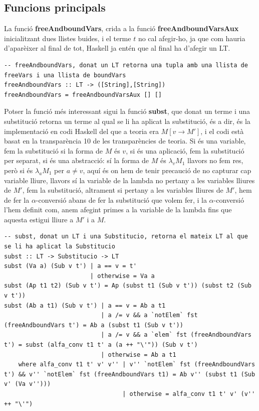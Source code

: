 \documentclass[10pt,a4paper]{article}
\begin{document}
\clearpage

\subsection{Funcions principals}

La funció \textbf{freeAndboundVars}, crida a la funció \textbf{freeAndboundVarsAux} inicialitzant dues llistes buides, i el terme $t$ no cal afegir-ho, ja que com hauria d'aparèixer al final de tot, Haskell ja entén que al final ha d'afegir un LT.

\lstset{language=Haskell, breaklines=true, basicstyle=\footnotesize}
\begin{lstlisting}[frame=mystyle]
-- freeAndboundVars, donat un LT retorna una tupla amb una llista de freeVars i una llista de boundVars
freeAndboundVars :: LT -> ([String],[String])
freeAndboundVars = freeAndboundVarsAux [] []
\end{lstlisting}

Potser la funció més interessant sigui la funció \textbf{subst}, que donat un terme i una substitució retorna un terme al qual se li ha aplicat la substitució, és a dir, és la implementació en codi Haskell del que a teoria era $M [v \rightarrow M']$, i el codi està basat en la transparència 10 de les transparències de teoria. Si és una variable, fem la substitució si la forma de $M$ és $v$, si és una aplicació, fem la substitució per separat, si és una abstracció: sí la forma de $M$ és $\lambda_v M_1$ llavors no fem res, però si és $\lambda_a M_1$ per $a \neq v$, aquí és on hem de tenir precaució de no capturar cap variable lliure, llavors sí la variable de la lambda no pertany a les variables lliures de $M'$, fem la substitució, altrament si pertany a les variables lliures de $M'$, hem de fer la $\alpha$-conversió abans de fer la substitució que volem fer, i la $\alpha$-conversió l'hem definit com, anem afegint primes a la variable de la lambda fins que aquesta estigui lliure a $M'$ i a $M$.

\lstset{language=Haskell, breaklines=true, basicstyle=\footnotesize}
\begin{lstlisting}[frame=mystyle]
-- subst, donat un LT i una Substitucio, retorna el mateix LT al que se li ha aplicat la Substitucio
subst :: LT -> Substitucio -> LT
subst (Va a) (Sub v t') | a == v = t'
                        | otherwise = Va a
subst (Ap t1 t2) (Sub v t') = Ap (subst t1 (Sub v t')) (subst t2 (Sub v t'))
subst (Ab a t1) (Sub v t') | a == v = Ab a t1
                           | a /= v && a `notElem` fst (freeAndboundVars t') = Ab a (subst t1 (Sub v t'))
                           | a /= v && a `elem` fst (freeAndboundVars t') = subst (alfa_conv t1 t' a (a ++ "\'")) (Sub v t')
                           | otherwise = Ab a t1
    where alfa_conv t1 t' v' v'' | v'' `notElem` fst (freeAndboundVars t') && v'' `notElem` fst (freeAndboundVars t1) = Ab v'' (subst t1 (Sub v' (Va v'')))
                                 | otherwise = alfa_conv t1 t' v' (v'' ++ "\'")
\end{lstlisting}
\end{document}
